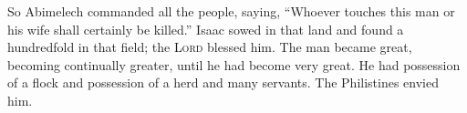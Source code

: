 \begin{inparaenum}
     So Abimelech commanded all the people, saying, ``Whoever touches this man or his wife shall certainly be killed.''%
     Isaac sowed in that land and found a hundredfold in that field; the \textsc{Lord} blessed him.%
     The man became great, becoming continually greater, until he had become very great.%
     He had possession of a flock and possession of a herd and many servants. The Philistines envied him.%
    
\end{inparaenum}
